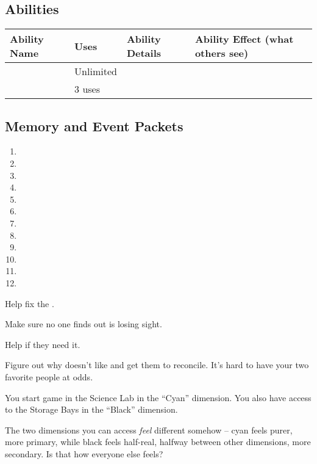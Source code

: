 \documentclass[char]{TMFHope}
\begin{document}
\subsection*{Abilities}
\begin{tabular}{|p{2cm}|p{1.5cm}|p{9cm}|p{3.5cm}|} 
 \hline
 \textbf{Ability Name} & \textbf{Uses} & \textbf{Ability Details} & \textbf{Ability Effect (what others see)} \\ 
\hline 
 \aEngineering{\MYname} & Unlimited & \aEngineering{\MYtext} & \aEngineering{\MYeffect} \\ 
\hline
 \aNegotiation{\MYname} & 3 uses & \aNegotiation{\MYtext} & \aNegotiation{\MYeffect}\\ 
 \hline
\end{tabular}

\subsection*{Memory and Event Packets}
\begin{enumerate}
	\item \mPractice{\MYname}
	\item \mAlpha{\MYname}
	\item \mDeckHandOne{\MYname}
	\item \mRepairsTwo{\MYname}
	\item \mRepairsFour{\MYname}
	\item \mBroom{\MYname}
	\item \mLab{\MYname}
	\item \mPatient{\MYname}
	\item \mKitchen{\MYname}
	\item \mWeight{\MYname}
	\item \mTheater{\MYname}
	\item \mCrates{\MYname}
\end{enumerate}

\begin{itemz}[Goals]
	\item Help \cEng{} fix the \pNew{}.
	\item Make sure no one finds out \cEng{} is losing \cEng{\their} sight.
	\item Help \cNav{} if they need it.
	\item Figure out why \cEng{} doesn't like \cNav{} and get them to reconcile. It's hard to have your two favorite people at odds.
\end{itemz}

\begin{itemz}[Notes]
	\item You start game in the Science Lab in the ``Cyan'' dimension. You also have access to the Storage Bays in the ``Black'' dimension.
	\item The two dimensions you can access {\em feel} different somehow -- cyan feels purer, more primary, while black feels half-real, halfway between other dimensions, more secondary.  Is that how everyone else feels?
\end{itemz}
\end{document}
